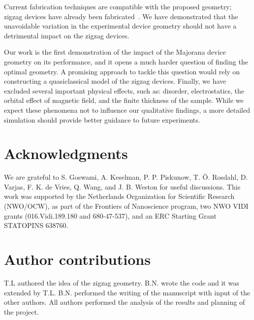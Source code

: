 \documentclass[english, twocolumn, 10pt, aps, superscriptaddress, floatfix, prb, citeautoscript]{revtex4-1}
\renewcommand{\comment}[2]{#2}
\begin{document}
\comment{Current fabrication techniques are compatible with the proposed geometry, and experimental verification can be near.}
Current fabrication techniques are compatible with the proposed geometry; zigzag devices have already been fabricated~\cite{Vries}.
We have demonstrated that the unavoidable variation in the experimental device geometry should not have a detrimental impact on the zigzag devices.

\comment{Optimizing the geometry, more detailed modeling, and a simple analytical estimation are open questions for further research}
Our work is the first demonstration of the impact of the Majorana device geometry on its performance, and it opens a much harder question of finding the optimal geometry.
A promising approach to tackle this question would rely on constructing a quasiclassical model of the zigzag devices.
Finally, we have excluded several important physical effects, such as: disorder, electrostatics, the orbital effect of magnetic field, and the finite thickness of the sample.
While we expect these phenomena not to influence our qualitative findings, a more detailed simulation should provide better guidance to future experiments.


\section{Acknowledgments}
We are grateful to  S. Goswami, A. Keselman, P. P. Piskunow, T. Ö. Rosdahl, D. Varjas, F. K. de Vries, Q. Wang, and J. B. Weston for useful discussions.
This work was supported by the Netherlands Organization for Scientific Research (NWO/OCW), as part of the Frontiers of Nanoscience program, two NWO VIDI grants (016.Vidi.189.180 and 680-47-537), and an ERC Starting Grant STATOPINS 638760.

\section{Author contributions}
T.L authored the idea of the zigzag geometry.
B.N. wrote the code and it was extended by T.L.
B.N. performed the writing of the manuscript with input of the other authors.
All authors performed the analysis of the results and planning of the project.



\end{document}
